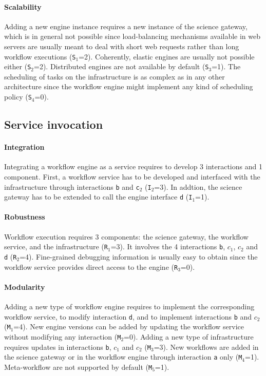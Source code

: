 \documentclass[preprint,3p,twocolumn]{elsarticle}
\begin{document}
\paragraph{Scalability} Adding a new engine instance requires a new
instance of the science gateway, which is in general not possible
since load-balancing mechanisms available in web servers are usually
meant to deal with short web requests rather than long workflow
executions (\texttt{S$_1$}=2). Coherently, elastic engines are usually
not possible either (\texttt{S$_2$}=2).  Distributed engines are not
available by default (\texttt{S$_3$}=1). The scheduling of tasks on
the infrastructure is as complex as in any other architecture since
the workflow engine might implement any kind of scheduling policy
(\texttt{S$_4$}=0).

\subsection{Service invocation} 

\paragraph{Integration} Integrating a workflow engine as a service
requires to develop 3 interactions and 1 component. First, a workflow
service has to be developed and interfaced with the infrastructure
through interactions \texttt{b} and \texttt{c$_2$}
(\texttt{I$_2$}=3). In addtion, the science gateway has to be extended
to call the engine interface \texttt{d} (\texttt{I$_1$}=1).

\paragraph{Robustness} Workflow execution requires 3 components: the
science gateway, the workflow service, and the infrastructure
(\texttt{R$_1$}=3). It involves the 4 interactions \texttt{b},
\texttt{$c_1$}, \texttt{$c_2$} and \texttt{d}
(\texttt{R$_2$}=4). Fine-grained debugging information is usually easy
to obtain since the workflow service provides direct access to the
engine (\texttt{R$_3$}=0).

\paragraph{Modularity} Adding a new type of workflow engine requires
to implement the corresponding workflow service, to modify interaction
\texttt{d}, and to implement interactions \texttt{b} and
\texttt{$c_2$} (\texttt{M$_1$}=4). New engine versions can be added by
updating the workflow service without modifying any interaction
(\texttt{M$_2$}=0). Adding a new type of infrastructure requires
updates in interactions \texttt{b}, \texttt{$c_1$} and \texttt{$c_2$}
(\texttt{M$_3$}=3). New workflows are added in the science gateway or
in the workflow engine through interaction \texttt{a} only
(\texttt{M$_4$}=1). Meta-workflow are not supported by default
(\texttt{M$_5$}=1).
\end{document}
